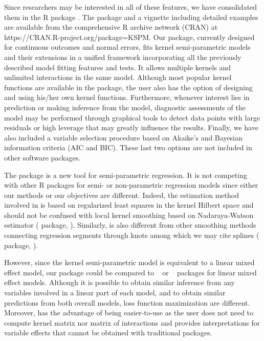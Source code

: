 Since researchers may be interested in all of these features, we have consolidated them in the R package . The package and a vignette including detailed examples are available from the comprehensive R archive network (CRAN) at https://CRAN.R-project.org/package=KSPM. Our package, currently designed for continuous outcomes and normal errors, fits kernel semi-parametric models and their extensions in a unified framework incorporating all the previously described model fitting features and tests. It allows multiple kernels and unlimited interactions in the same model. Although most popular kernel functions are available in the package, the user also has the option of designing and using his/her own kernel functions. Furthermore, whenever interest lies in prediction or making inference from the model, diagnostic assessments of the model may be performed through graphical tools to detect data points with large residuals or high leverage that may greatly influence the results. Finally, we have also included a variable selection procedure based on Akaike's and Bayesian information criteria (AIC and BIC). These last two options are not included in other software packages.


The  package is a new tool for semi-parametric regression. It is not competing with other R packages for semi- or non-parametric regression models since either our methods or our objectives are different. Indeed, the estimation method involved in  is based on regularized least squares in the kernel Hilbert space and should not be confused with local kernel smoothing based on Nadaraya-Watson estimator ( package, \cite{npPackage}). Similarly,  is also different from other smoothing methods connecting regression segments through knots among which we may cite splines ( package, \cite{mgcvPackage}). 

However, since the kernel semi-parametric model is equivalent to a linear mixed effect model, our package could be compared to ~\citep{lme4package} or ~\citep{nlmePackage} packages for linear mixed effect models. Although it is possible to obtain similar inference from any variables involved in a linear part of each model, and to obtain similar predictions from both overall models, loss function maximization are different. Moreover,  has the advantage of being easier-to-use as the user does not need to compute kernel matrix nor matrix of interactions and provides interpretations for variable effects that cannot be obtained with traditional packages.




